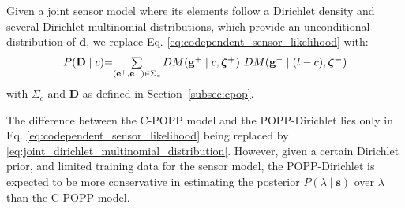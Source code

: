 Given a joint sensor model where its elements follow a Dirichlet density and several Dirichlet-multinomial distributions, which provide an unconditional distribution of $\mathbf{d}$, we replace Eq. \ref{eq:codependent_sensor_likelihood} with:  
\begin{equation}
	\label{eq:joint_dirichlet_multinomial_distribution}
    \begin{tabular}{r@{=}l}
		$P(\mathbf{D} \mid c)$ & $\sum\limits_{(\mathbf{e}^+, \mathbf{e}^-) \in \Sigma_c} DM(\mathbf{g}^+ \mid c, \boldsymbol{\zeta^+}) ~ DM(\mathbf{g}^- \mid (l - c), \boldsymbol{\zeta^-})$
	\end{tabular}
\end{equation}
\noindent with $\Sigma_c$ and $\mathbf{D}$ as defined in Section~\ref{subsec:cpop}.

The difference between the C-POPP model and the POPP-Dirichlet lies only in Eq. \ref{eq:codependent_sensor_likelihood} being replaced by \ref{eq:joint_dirichlet_multinomial_distribution}. However, given a certain Dirichlet prior, and limited training data for the sensor model, the POPP-Dirichlet is expected to be more conservative in estimating the posterior $P(\lambda \mid \mathbf{s})$ over $\lambda$ than the C-POPP model.

